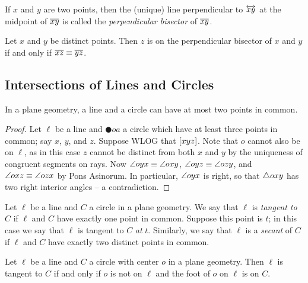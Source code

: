 \begin{dfn}
If \(x\) and \(y\) are two points, then the (unique) line perpendicular to \(\overleftrightarrow{xy}\) at the midpoint of \(\overline{xy}\) is called the \emph{perpendicular bisector} of \(\overline{xy}\).
\end{dfn}

\begin{prop}
Let \(x\) and \(y\) be distinct points.
Then \(z\) is on the perpendicular bisector of \(x\) and \(y\) if and only if \(\overline{xz} \equiv \overline{yz}\).
\end{prop}

\subsection*{Intersections of Lines and Circles}

\begin{prop}
In a plane geometry, a line and a circle can have at most two points in common.
\end{prop}

\begin{proof}
Let \(\ell\) be a line and \(\CIRCLE{o}{a}\) a circle which have at least three points in common; say \(x\), \(y\), and \(z\).
Suppose WLOG that \([ x y z ]\).
Note that \(o\) cannot also be on \(\ell\), as in this case \(z\) cannot be distinct from both \(x\) and \(y\) by the uniqueness of congruent segments on rays.
Now \(\angle{oyx} \equiv \angle{oxy}\), \(\angle{oyz} \equiv \angle{ozy}\), and \(\angle{oxz} \equiv \angle{ozx}\) by Pons Asinorum.
In particular, \(\angle{oyx}\) is right, so that \(\bigtriangleup{oxy}\) has two right interior angles -- a contradiction.
\end{proof}

\begin{dfn}
Let \(\ell\) be a line and \(C\) a circle in a plane geometry.
We say that \(\ell\) is \emph{tangent to} \(C\) if \(\ell\) and \(C\) have exactly one point in common.
Suppose this point is \(t\); in this case we say that \(\ell\) is tangent to \(C\) \emph{at} \(t\).
Similarly, we say that \(\ell\) is a \emph{secant} of \(C\) if \(\ell\) and \(C\) have exactly two distinct points in common.
\end{dfn}

\begin{prop}
Let \(\ell\) be a line and \(C\) a circle with center \(o\) in a plane geometry.
Then \(\ell\) is tangent to \(C\) if and only if \(o\) is not on \(\ell\) and the foot of \(o\) on \(\ell\) is on \(C\).
\end{prop}

